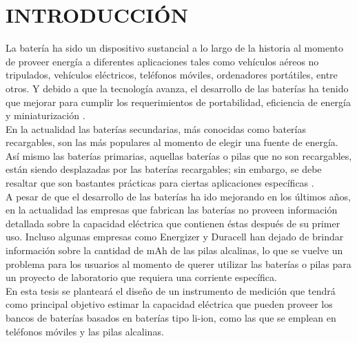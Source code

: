 \chapter*{INTRODUCCIÓN}
La batería ha sido un dispositivo sustancial a lo largo de la historia al momento de proveer energía a diferentes aplicaciones tales como vehículos aéreos no tripulados, vehículos eléctricos, teléfonos móviles, ordenadores portátiles, entre otros. Y debido a que la tecnología avanza, el desarrollo de las baterías ha tenido que mejorar para cumplir los requerimientos de portabilidad, eficiencia de energía y miniaturización \cite{ChristopherMims}. \\

En la actualidad las baterías secundarias, más conocidas como baterías recargables, son las más populares al momento de elegir una fuente de energía. Así mismo las baterías primarias, aquellas baterías o pilas que no son recargables, están siendo desplazadas por las baterías recargables; sin embargo, se debe resaltar que son bastantes prácticas para ciertas aplicaciones específicas \cite{Buchmann2011}. \\

A pesar de que el desarrollo de las baterías ha ido mejorando en los últimos años, en la actualidad las empresas que fabrican las baterías no proveen información detallada sobre la capacidad eléctrica que contienen éstas después de su primer uso. Incluso algunas empresas como Energizer y Duracell han dejado de brindar información sobre la cantidad de mAh de las pilas alcalinas, lo que se vuelve un problema para los usuarios al momento de querer utilizar las baterías o pilas para un proyecto de laboratorio que requiera una corriente específica.\\

En esta tesis se planteará el diseño de un instrumento de medición que tendrá como principal objetivo estimar la capacidad eléctrica que pueden proveer los bancos de baterías basados en baterías tipo li-ion, como las que se emplean en teléfonos móviles y las pilas alcalinas.
\pagebreak